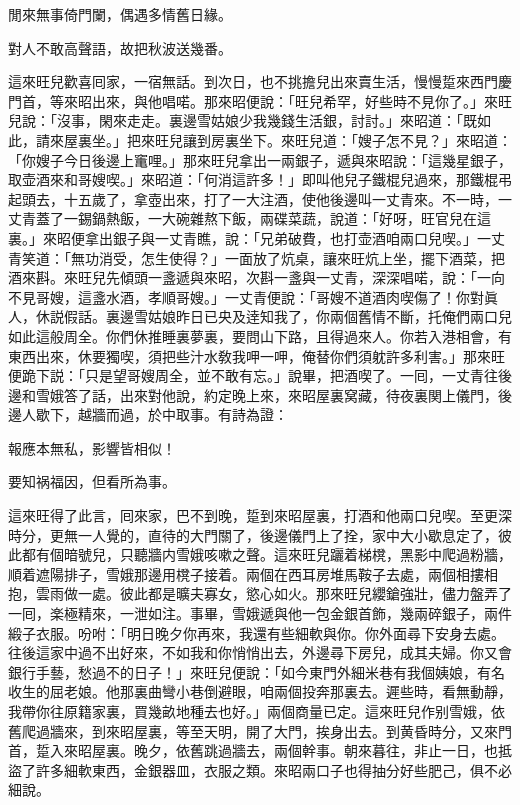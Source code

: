 \begin{myquote}
閒來無事倚門闌，偶遇多情舊日緣。

對人不敢高聲語，故把秋波送幾番。
\end{myquote}

這來旺兒歡喜囘家，一宿無話。到次日，也不挑擔兒出來賣生活，慢慢踅來西門慶門首，等來昭出來，與他唱喏。那來昭便說：「旺兒希罕，好些時不見你了。」來旺兒說：「沒事，閑來走走。裏邊雪姑娘少我幾錢生活銀，討討。」來昭道：「既如此，請來屋裏坐。」把來旺兒讓到房裏坐下。來旺兒道：「嫂子怎不見？」來昭道：「你嫂子今日後邊上竃哩。」那來旺兒拿出一兩銀子，遞與來昭說：「這幾星銀子，取壶酒來和哥嫂喫。」來昭道：「何消這許多！」即叫他兒子鐵棍兒過來，那鐵棍弔起頭去，十五歲了，拿壺出來，打了一大注酒，使他後邊叫一丈青來。不一時，一丈青蓋了一錫鍋熱飯，一大碗雜熬下飯，兩碟菜蔬，說道：「好呀，旺官兒在這裏。」來昭便拿出銀子與一丈青瞧，說：「兄弟破費，也打壶酒咱兩口兒喫。」一丈青笑道：「無功消受，怎生使得？」一面放了炕桌，讓來旺炕上坐，擺下酒菜，把酒來斟。來旺兒先傾頭一盞遞與來昭，次斟一盞與一丈青，深深唱喏，說：「一向不見哥嫂，這盞水酒，孝順哥嫂。」一丈青便說：「哥嫂不道酒肉喫傷了！你對眞人，休説假話。裏邊雪姑娘昨日已央及逹知我了，你兩個舊情不斷，托俺們兩口兒如此這般周全。你們休推睡裏夢裏，要問山下路，且得過來人。你若入港相會，有東西出來，休要獨喫，須把些汁水敎我呷一呷，俺替你們須躭許多利害。」那來旺便跪下説：「只是望哥嫂周全，並不敢有忘。」說畢，把酒喫了。一囘，一丈青往後邊和雪娥答了話，出來對他說，約定晚上來，來昭屋裏窝藏，待夜裏関上儀門，後邊人歇下，越牆而過，於中取事。有詩為證：

\begin{myquote}
報應本無私，影響皆相似！

要知祸福因，但看所為事。
\end{myquote}

這來旺得了此言，囘來家，巴不到晚，踅到來昭屋裏，打酒和他兩口兒喫。至更深時分，更無一人覺的，直待的大門關了，後邊儀門上了拴，家中大小歇息定了，彼此都有個暗號兒，只聽牆内雪娥咳嗽之聲。這來旺兒躧着梯櫈，黑影中爬過粉牆，順着遮陽排子，雪娥那邊用櫈子接着。兩個在西耳房堆馬鞍子去處，兩個相摟相抱，雲雨做一處。彼此都是曠夫寡女，慾心如火。那來旺兒纓鎗強壯，儘力盤弄了一囘，楽極精來，一泄如注。事畢，雪娥遞與他一包金銀首飾，幾兩碎銀子，兩件緞子衣服。吩咐：「明日晚夕你再來，我還有些細軟與你。你外面尋下安身去處。往後這家中過不出好來，不如我和你悄悄出去，外邊尋下房兒，成其夫婦。你又會銀行手藝，愁過不的日子！」來旺兒便說：「如今東門外細米巷有我個姨娘，有名收生的屈老娘。他那裏曲彎小巷倒避眼，咱兩個投奔那裏去。遲些時，看無動靜，我帶你往原籍家裏，買幾畝地種去也好。」兩個商量已定。這來旺兒作别雪娥，依舊爬過牆來，到來昭屋裏，等至天明，開了大門，挨身出去。到黄昏時分，又來門首，踅入來昭屋裏。晚夕，依舊跳過牆去，兩個幹事。朝來暮往，非止一日，也抵盜了許多細軟東西，金銀器皿，衣服之類。來昭兩口子也得抽分好些肥己，俱不必細說。

